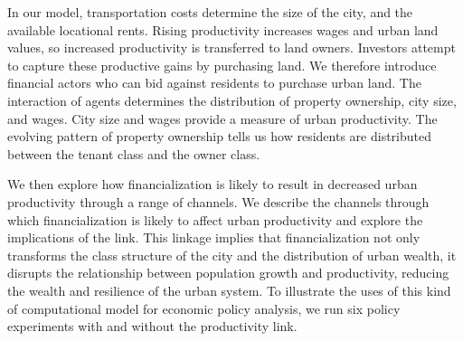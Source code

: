 In our model, transportation costs determine the size of the city, and the available locational rents. Rising productivity increases wages and urban land values, so increased productivity is transferred to land owners. Investors attempt to capture these productive gains by purchasing land. %
We therefore introduce financial actors who can bid against residents to purchase urban land. %
The interaction of agents determines the distribution of property ownership,  city size, and wages. City size and wages provide a measure of urban productivity. The evolving pattern of property ownership tells us how residents are distributed between the tenant class and the owner class. %
 


We then explore how financialization is likely to result in decreased urban productivity through a range of channels. 
We describe the channels through which financialization is likely to affect urban productivity and explore the implications of the link. %
This linkage implies that financialization not only transforms the class structure of the city and the distribution of urban wealth, it disrupts the relationship between population growth and productivity, reducing the wealth and resilience of the urban system. 
To illustrate the uses of this kind of computational model for economic policy analysis, we run six policy experiments with and without the productivity link.  

